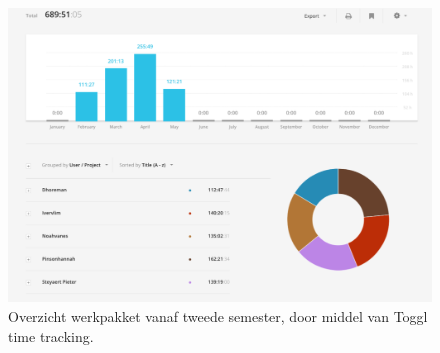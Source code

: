 \documentclass{article}
\begin{document}
\begin{figure}[h!]
\centering
 \includegraphics[scale=0.4]{toggl_tweede_semester.pdf}
 \caption{Overzicht werkpakket vanaf tweede semester, door middel van Toggl time tracking. }
 \label{fig:overzicht}
\end{figure}
\end{document}
